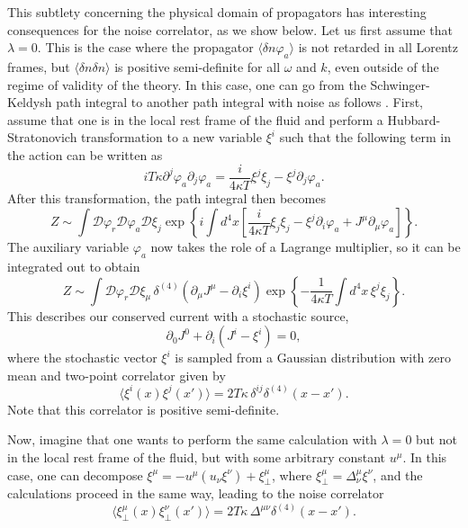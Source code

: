 \documentclass[aps,prd,nofootinbib,amsmath,amssymb,showpacs,longbibliography,singlecolumn,superscriptaddress,notitlepage]{revtex4-1}
\theoremstyle{plain}
\theoremstyle{definition}
\begin{document}
This subtlety concerning the physical domain of propagators has interesting consequences for the noise correlator, as we show below. Let us first assume that $\lambda=0$. This is the case where the propagator $\langle \delta n \varphi_a\rangle$ is not retarded in all Lorentz frames, but $\langle \delta n \delta n\rangle$ is positive semi-definite for all $\omega$ and $k$, even outside of the regime of validity of the theory. In this case, one can go from the Schwinger-Keldysh path integral to another path integral with noise as follows \cite{Liu:2018kfw}. First, assume that one is in the local rest frame of the fluid and perform a Hubbard-Stratonovich transformation to a new variable $\xi^{i}$ such that the following term in the action can be written as 
\begin{equation}
i T \kappa \partial^j \varphi_a \partial_j \varphi_a = \frac{i}{4\kappa T}\xi^j \xi_j - \xi^j \partial_j\varphi_a . 
\end{equation}
After this transformation, the path integral then becomes
\begin{equation}
    Z \sim \int  \mathcal{D} \varphi_r \mathcal{D} \varphi_a\mathcal{D} \xi_{j} \exp \left\{ i \int d^4x \left[ \frac{i}{4 \kappa T} \xi_{j} \xi_{j} - \xi^{j} \partial_i \varphi_a + J^{\mu} \partial_\mu \varphi_a \right] \right\} .
\end{equation}
The auxiliary variable $\varphi_a$ now takes the role of a Lagrange multiplier, so it can be integrated out to obtain 
\begin{equation}
    Z \sim \int \mathcal{D}\varphi_r \mathcal{D} \xi_{\mu}\, \delta^{(4)} \left(\partial_\mu J^{\mu} - \partial_i\xi^{i} \right) \exp\left\{- \frac{1}{4\kappa T}\int d^4x\, \xi^{j}  \xi_{j}\right\}.
\end{equation}
This describes our conserved current with a stochastic source, 
\begin{equation}
\partial_{0} J^{0} + \partial_i (J^i-\xi^i)= 0,
\end{equation}
where the stochastic vector $\xi^{i}$ is sampled from a Gaussian distribution with zero mean and two-point correlator given by
\begin{equation}
    \langle \xi^{i}(x) \xi^{j}(x') \rangle =2 T \kappa\, \delta^{ij} \delta^{(4)}(x-x') .
    \label{noise_1}
\end{equation}
Note that this correlator is positive semi-definite. 




Now, imagine that one wants to perform the same calculation with $\lambda=0$ but not in the local rest frame of the fluid, but with some arbitrary constant $u^\mu$. In this case,  one can decompose $\xi^\mu = - u^\mu (u_\nu \xi^\nu) + \xi^\mu_\perp$, where $\xi^\mu_\perp = \Delta^\mu_\nu \xi^\nu$, and the calculations proceed in the same way, leading to the noise correlator 
\begin{equation}
    \langle \xi_\perp^{\mu}(x) \xi_\perp^{\nu}(x') \rangle =2 T \kappa\, \Delta^{\mu\nu} \delta^{(4)}(x-x') .
    \label{noise_new}
\end{equation}
\end{document}
